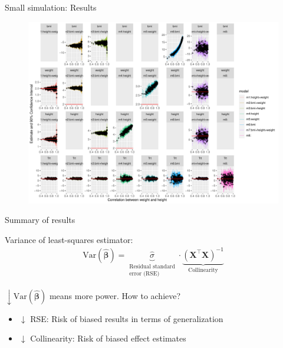 \documentclass[english]{beamer}\usepackage[]{graphicx}\usepackage[]{xcolor}
\makeatletter
\def\maxwidth{ %
  \ifdim\Gin@nat@width>\linewidth
    \linewidth
  \else
    \Gin@nat@width
  \fi
}
\newenvironment{knitrout}{}{} %
\makeatother
\begin{document}
\begin{frame}[plain]{Small simulation: Results}

\begin{figure}[h]%
\begin{center}
\begin{knitrout}
\color{fgcolor}
\includegraphics[width=\maxwidth]{figures/figresults-1} 
\end{knitrout}
\end{center}
\end{figure}

\end{frame}
\begin{frame}{Summary of results}

Variance of least-squares estimator:
\begin{align*}
\text{Var}\left(\boldsymbol{\hat\beta}\right)=\underbrace{\hat{\sigma}}_{\substack{\text{Residual standard}\\\text{error (RSE)}}}\cdot \underbrace{\left(\boldsymbol{X}^\top\boldsymbol{X}\right)^{-1}}_{\text{Collinearity}}
\end{align*}

$\downarrow\text{Var}\left(\boldsymbol{\hat\beta}\right)$ means more power. How to achieve?
\begin{itemize}
\item $\downarrow$ RSE: Risk of biased results in terms of generalization
\item $\downarrow$ Collinearity: Risk of biased effect estimates
\end{itemize}


\end{frame}
\end{document}
